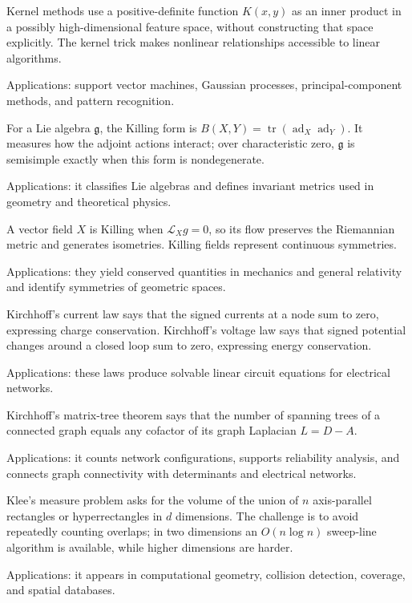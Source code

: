 Kernel methods use a positive-definite function $K(x,y)$ as an inner product in a possibly high-dimensional feature space, without constructing that space explicitly. The kernel trick makes nonlinear relationships accessible to linear algorithms. \par\noindent Applications: support vector machines, Gaussian processes, principal-component methods, and pattern recognition.

For a Lie algebra $\mathfrak g$, the Killing form is $B(X,Y)=\operatorname{tr}(\operatorname{ad}_X\operatorname{ad}_Y)$. It measures how the adjoint actions interact; over characteristic zero, $\mathfrak g$ is semisimple exactly when this form is nondegenerate. \par\noindent Applications: it classifies Lie algebras and defines invariant metrics used in geometry and theoretical physics.

A vector field $X$ is Killing when $\mathcal L_Xg=0$, so its flow preserves the Riemannian metric and generates isometries. Killing fields represent continuous symmetries. \par\noindent Applications: they yield conserved quantities in mechanics and general relativity and identify symmetries of geometric spaces.

Kirchhoff's current law says that the signed currents at a node sum to zero, expressing charge conservation. Kirchhoff's voltage law says that signed potential changes around a closed loop sum to zero, expressing energy conservation. \par\noindent Applications: these laws produce solvable linear circuit equations for electrical networks.

Kirchhoff's matrix-tree theorem says that the number of spanning trees of a connected graph equals any cofactor of its graph Laplacian $L=D-A$. \par\noindent Applications: it counts network configurations, supports reliability analysis, and connects graph connectivity with determinants and electrical networks.

Klee's measure problem asks for the volume of the union of $n$ axis-parallel rectangles or hyperrectangles in $d$ dimensions. The challenge is to avoid repeatedly counting overlaps; in two dimensions an $O(n\log n)$ sweep-line algorithm is available, while higher dimensions are harder. \par\noindent Applications: it appears in computational geometry, collision detection, coverage, and spatial databases.

